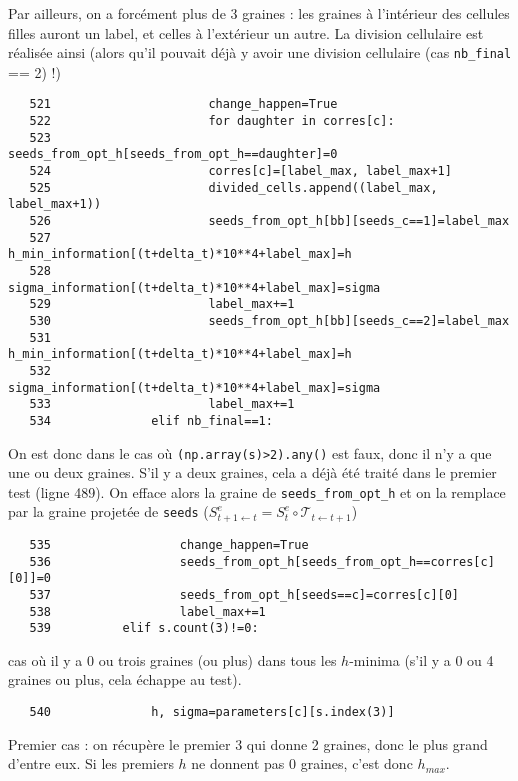 \documentclass{article}
\def \mycolor {red}
\begin{document}
Par ailleurs, on a forc\'ement plus de 3 graines : les graines \`a l'int\'erieur des cellules filles auront un label, et celles \`a l'ext\'erieur un autre. La division cellulaire est r\'ealis\'ee ainsi (alors qu'il pouvait d\'ej\`a y avoir une division cellulaire (cas \verb|nb_final| == 2) !)

\color{black}
\begin{verbatim} 
   521	                    change_happen=True
   522	                    for daughter in corres[c]:
   523	                        seeds_from_opt_h[seeds_from_opt_h==daughter]=0
   524	                    corres[c]=[label_max, label_max+1]
   525	                    divided_cells.append((label_max, label_max+1))
   526	                    seeds_from_opt_h[bb][seeds_c==1]=label_max
   527	                    h_min_information[(t+delta_t)*10**4+label_max]=h
   528	                    sigma_information[(t+delta_t)*10**4+label_max]=sigma
   529	                    label_max+=1
   530	                    seeds_from_opt_h[bb][seeds_c==2]=label_max
   531	                    h_min_information[(t+delta_t)*10**4+label_max]=h
   532	                    sigma_information[(t+delta_t)*10**4+label_max]=sigma
   533	                    label_max+=1
   534	            elif nb_final==1:
\end{verbatim} 
\color{\mycolor}
On est donc dans le cas o\`u \verb|(np.array(s)>2).any()| est faux, donc il n'y a que une ou deux graines. S'il y a deux graines, cela a d\'ej\`a \'et\'e trait\'e dans le premier test (ligne 489). On efface alors la graine de \verb|seeds_from_opt_h| et on la remplace par la graine projet\'ee de \verb|seeds| ($S^e_{t+1 \leftarrow t} = S^e_t \circ \mathcal{T}_{t \leftarrow t+1}$)
\color{black}
\begin{verbatim} 
   535	                change_happen=True
   536	                seeds_from_opt_h[seeds_from_opt_h==corres[c][0]]=0
   537	                seeds_from_opt_h[seeds==c]=corres[c][0]
   538	                label_max+=1
   539	        elif s.count(3)!=0:
\end{verbatim} 
\color{\mycolor}
cas o\`u il y a 0 ou trois graines (ou plus) dans tous les $h$-minima (s'il y a 0 ou 4 graines ou plus, cela échappe au test).
\color{black}
\begin{verbatim} 
   540	            h, sigma=parameters[c][s.index(3)]
\end{verbatim} 
\color{\mycolor}
Premier cas : on r\'ecup\`ere le premier $3$ qui donne 2 graines, donc le plus grand d'entre eux. Si les premiers $h$ ne donnent pas $0$ graines, c'est donc $h_{max}$.
\end{document}
